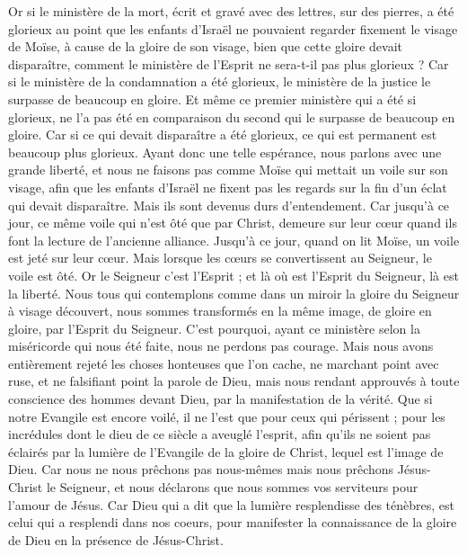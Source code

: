 \begin{multicols}{2}
Or si le ministère de la mort, écrit et gravé avec des lettres, sur des pierres, a été glorieux au point que les enfants d'Israël ne pouvaient regarder fixement le visage de Moïse, à cause de la gloire de son visage, bien que cette gloire devait disparaître,
comment le ministère de l'Esprit ne sera-t-il pas plus glorieux ?
Car si le ministère de la condamnation a été glorieux, le ministère de la justice le surpasse de beaucoup en gloire.
Et même ce premier ministère qui a été si glorieux, ne l'a pas été en comparaison du second qui le surpasse de beaucoup en gloire.
Car si ce qui devait disparaître a été glorieux, ce qui est permanent est beaucoup plus glorieux.
Ayant donc une telle espérance, nous parlons avec une grande liberté,
et nous ne faisons pas comme Moïse qui mettait un voile sur son visage, afin que les enfants d'Israël ne fixent pas les regards sur la fin d’un éclat qui devait disparaître.
Mais ils sont devenus durs d’entendement. Car jusqu'à ce jour, ce même voile qui n’est ôté que par Christ, demeure sur leur cœur quand ils font la lecture de l'ancienne alliance\FTNT{}.
Jusqu'à ce jour, quand on lit Moïse, un voile est jeté sur leur cœur.
Mais lorsque les cœurs se convertissent au Seigneur, le voile est ôté.
Or le Seigneur c’est l’Esprit ; et là où est l'Esprit du Seigneur, là est la liberté.
Nous tous qui contemplons comme dans un miroir la gloire du Seigneur à visage découvert, nous sommes transformés en la même image, de gloire en gloire, par l'Esprit du Seigneur.
\VerseOne{}C'est pourquoi, ayant ce ministère selon la miséricorde qui nous été faite, nous ne perdons pas courage.
Mais nous avons entièrement rejeté les choses honteuses que l'on cache, ne marchant point avec ruse, et ne falsifiant point la parole de Dieu, mais nous rendant approuvés à toute conscience des hommes devant Dieu, par la manifestation de la vérité.
Que si notre Evangile est encore voilé, il ne l'est que pour ceux qui périssent ;
pour les incrédules dont le dieu de ce siècle a aveuglé l’esprit, afin qu’ils ne soient pas éclairés par la lumière de l'Evangile de la gloire de Christ, lequel est l'image de Dieu.
Car nous ne nous prêchons pas nous-mêmes mais nous prêchons Jésus-Christ le Seigneur, et nous déclarons que nous sommes vos serviteurs pour l'amour de Jésus.
Car Dieu qui a dit que la lumière resplendisse des ténèbres, est celui qui a resplendi dans nos coeurs, pour manifester la connaissance de la gloire de Dieu en la présence de Jésus-Christ.

\end{multicols}
